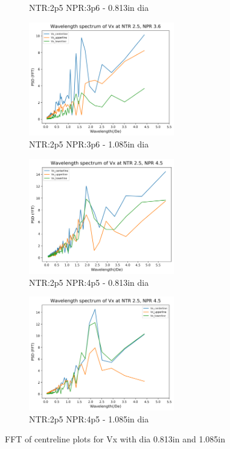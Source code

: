 \begin{figure}[H]
\begin{subfigure}{.5\textwidth}
	\caption{NTR:2p5 NPR:3p6 - 0.813in dia}
	\label{fig:lineplotsfftb2p53p6}
\end{subfigure}%
\begin{subfigure}{.5\textwidth}
	\centering
	\includegraphics[width=2.5in]{images/Fft_Vx_NTR2p5_NPR3p6b.png}
	\caption{NTR:2p5 NPR:3p6 - 1.085in dia}
	\label{fig:lineplotsfftb2p53p6b}
\end{subfigure}
\begin{subfigure}{.5\textwidth}
	\centering
	\includegraphics[width=2.5in]{images/Fft_Vx_NTR2p5_NPR4p5.png}
	\caption{NTR:2p5 NPR:4p5 - 0.813in dia}
	\label{fig:lineplotsfftb2p54p5}
\end{subfigure}%
\begin{subfigure}{.5\textwidth}
	\centering
	\includegraphics[width=2.5in]{images/Fft_Vx_NTR2p5_NPR4p5b.png}
	\caption{NTR:2p5 NPR:4p5 - 1.085in dia}
	\label{fig:lineplotsfftb2p54p5b}
\end{subfigure}
\caption{FFT of centreline plots for Vx with dia 0.813in and 1.085in }
\label{fig:lineplotsfftb}
\end{figure}

